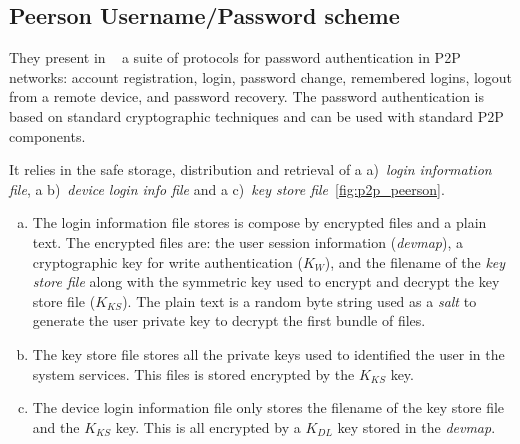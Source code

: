 \subsection{Peerson Username/Password scheme}

They present in ~\cite{kreitz2012passwords} a suite of protocols for password
authentication in P2P networks: account registration, login, password change,
remembered logins, logout from a remote device, and password recovery. The
password authentication is based on standard cryptographic techniques and can
be used with standard P2P components. 

It relies in the safe storage, distribution and retrieval of a a)~\textit{login information
file}, a b)~\textit{device login info file} and a c)~\textit{key store
file}~\ref{fig:p2p_peerson}.

\begin{enumerate}[a)]

  \item The login information file stores is compose by encrypted files and a
plain text. The encrypted files are: the user session information (\textit{devmap}), a
cryptographic key for write authentication ($K_W$), and the filename of the
\textit{key store file} along with the symmetric key used to encrypt and
decrypt the key store file ($K_{KS}$). The plain text is a random byte string used as a \textit{salt} to generate the user private key to
decrypt the first bundle of files. 

  \item The key store file stores all the private keys used to identified the
    user in the system services. This files is stored encrypted by the $K_{KS}$ key.

  \item The device login information file only stores the filename of the key
    store file and the $K_{KS}$ key. This is all encrypted by a $K_{DL}$ key
    stored in the \textit{devmap}.
\end{enumerate}


